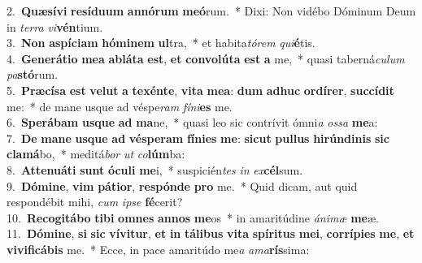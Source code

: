 {2.~}\textbf{Quæ}\textbf{sí}\textbf{vi} \textbf{re}\textbf{sí}\textbf{du}\textbf{um} \textbf{an}\textbf{nó}\textbf{rum} \textbf{me}\textbf{ó}rum.~* Dixi: Non vidébo Dóminum Deum in \textit{ter}\textit{ra} \textit{vi}\textbf{vén}tium.\\
{3.~}\textbf{Non} \textbf{a}\textbf{spí}\textbf{ci}\textbf{am} \textbf{hó}\textbf{mi}\textbf{nem} \textbf{ul}tra,~* et habita\textit{tó}\textit{rem} \textit{qui}\textbf{é}tis.\\
{4.~}\textbf{Ge}\textbf{ne}\textbf{rá}\textbf{ti}\textbf{o} \textbf{me}\textbf{a} \textbf{a}\textbf{blá}\textbf{ta} \textbf{est}, \textbf{et} \textbf{con}\textbf{vo}\textbf{lú}\textbf{ta} \textbf{est} \textbf{a} me,~* quasi taberná\textit{cu}\textit{lum} \textit{pa}\textbf{stó}rum.\\
{5.~}\textbf{Præ}\textbf{cí}\textbf{sa} \textbf{est} \textbf{ve}\textbf{lut} \textbf{a} \textbf{te}\textbf{xén}\textbf{te}, \textbf{vi}\textbf{ta} \textbf{me}\textbf{a}: \textbf{dum} \textbf{a}\textbf{dhuc} \textbf{or}\textbf{dí}\textbf{rer}, \textbf{suc}\textbf{cí}\textbf{dit} me:~* de mane usque ad véspe\textit{ram} \textit{fí}\textit{ni}\textbf{es} me.\\
{6.~}\textbf{Spe}\textbf{rá}\textbf{bam} \textbf{us}\textbf{que} \textbf{ad} \textbf{ma}ne,~* quasi leo sic contrívit ómni\textit{a} \textit{os}\textit{sa} \textbf{me}a:\\
{7.~}\textbf{De} \textbf{ma}\textbf{ne} \textbf{us}\textbf{que} \textbf{ad} \textbf{vé}\textbf{spe}\textbf{ram} \textbf{fí}\textbf{ni}\textbf{es} \textbf{me}: \textbf{si}\textbf{cut} \textbf{pul}\textbf{lus} \textbf{hi}\textbf{rún}\textbf{di}\textbf{nis} \textbf{sic} \textbf{cla}\textbf{má}bo,~* meditá\textit{bor} \textit{ut} \textit{co}\textbf{lúm}ba:\\
{8.~}\textbf{At}\textbf{te}\textbf{nu}\textbf{á}\textbf{ti} \textbf{sunt} \textbf{ó}\textbf{cu}\textbf{li} \textbf{me}i,~* suspicién\textit{tes} \textit{in} \textit{ex}\textbf{cél}sum.\\
{9.~}\textbf{Dó}\textbf{mi}\textbf{ne}, \textbf{vim} \textbf{pá}\textbf{ti}\textbf{or}, \textbf{re}\textbf{spón}\textbf{de} \textbf{pro} me.~* Quid dicam, aut quid respondébit mihi, \textit{cum} \textit{i}\textit{pse} \textbf{fé}cerit?\\
{10.~}\textbf{Re}\textbf{co}\textbf{gi}\textbf{tá}\textbf{bo} \textbf{ti}\textbf{bi} \textbf{om}\textbf{nes} \textbf{an}\textbf{nos} \textbf{me}os~* in amaritúdine \textit{á}\textit{ni}\textit{mæ} \textbf{me}æ.\\
{11.~}\textbf{Dó}\textbf{mi}\textbf{ne}, \textbf{si} \textbf{sic} \textbf{ví}\textbf{vi}\textbf{tur}, \textbf{et} \textbf{in} \textbf{tá}\textbf{li}\textbf{bus} \textbf{vi}\textbf{ta} \textbf{spí}\textbf{ri}\textbf{tus} \textbf{me}\textbf{i}, \textbf{cor}\textbf{rí}\textbf{pi}\textbf{es} \textbf{me}, \textbf{et} \textbf{vi}\textbf{vi}\textbf{fi}\textbf{cá}\textbf{bis} me.~* Ecce, in pace amaritúdo me\textit{a} \textit{a}\textit{ma}\textbf{rís}sima:\\
